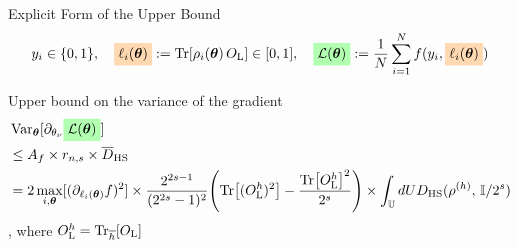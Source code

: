 \documentclass[dvipdfmx,10pt,aspectratio=169]{beamer}
\begin{document}
\begin{frame}{Explicit Form of the Upper Bound}
    $$
        y_i \in \{0,1\},\quad \colorbox{orange!30}{$\ell_i(\bth)$} := \Tr[\rho_i(\bth)\,O_\rmL] \in [0,1],\quad
        \colorbox{green!30}{$\calL(\bth)$} := \frac1N\sum_{i=1}^N f(y_i, \colorbox{orange!30}{$\ell_i(\bth)$})
    $$
    \begin{theorem}
        Upper bound on the variance of the gradient
        \begin{align*}
            &\Var_{\bth}[\pd_{\theta_\nu} \colorbox{green!30}{$\calL(\bth)$}]\\
            &\leq A_f \times r_{n,s} \times \bar{D}_{\mathrm{HS}}\\
            &=
            2\max_{i,\bth} [(\pd_{\ell_i(\bth)}f)^2]
            \times \frac{2^{2s-1}}{(2^{2s}-1)^2}\qty(\Tr[(O_\rmL^h)^2] - \frac{\Tr[O_\rmL^h]^2}{2^s})
            \times \int_{\bbU}dU D_{\mathrm{HS}} ( \rho^{(h)},\, \bbI/2^s )
        \end{align*}
        , where $O_{\mathrm{L}}^h = \Tr_{\overline{h}}[O_{\mathrm{L}}]$
    \end{theorem}
\end{frame}
\end{document}
